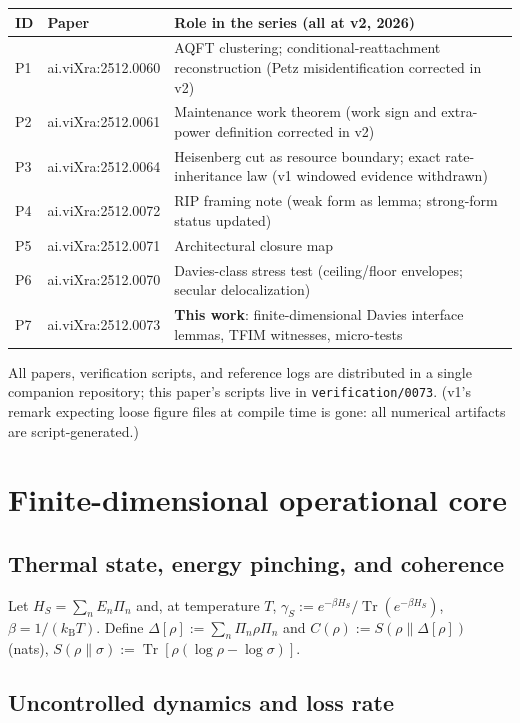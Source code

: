 \documentclass[11pt,a4paper]{article}
\theoremstyle{plain}
\theoremstyle{definition}
\theoremstyle{remark}
\newcommand{\Tr}{\operatorname{Tr}}
\newcommand{\kB}{k_{\mathrm{B}}}
\begin{document}
\begin{center}
\small
\begin{tabular}{lll}
\hline
ID & Paper & Role in the series (all at v2, 2026)\\
\hline
P1 & ai.viXra:2512.0060 & AQFT clustering; conditional-reattachment
reconstruction (Petz misidentification corrected in v2)\\
P2 & ai.viXra:2512.0061 & Maintenance work theorem (work sign and extra-power
definition corrected in v2)\\
P3 & ai.viXra:2512.0064 & Heisenberg cut as resource boundary; exact
rate-inheritance law (v1 windowed evidence withdrawn)\\
P4 & ai.viXra:2512.0072 & RIP framing note (weak form as lemma; strong-form
status updated)\\
P5 & ai.viXra:2512.0071 & Architectural closure map\\
P6 & ai.viXra:2512.0070 & Davies-class stress test (ceiling/floor envelopes;
secular delocalization)\\
P7 & ai.viXra:2512.0073 & \textbf{This work}: finite-dimensional Davies
interface lemmas, TFIM witnesses, micro-tests\\
\hline
\end{tabular}
\end{center}

All papers, verification scripts, and reference logs are distributed in a
single companion repository; this paper's scripts live in
\texttt{verification/0073}. (v1's remark expecting loose figure files at
compile time is gone: all numerical artifacts are script-generated.)

\section{Finite-dimensional operational core}

\subsection{Thermal state, energy pinching, and coherence}

Let $H_S = \sum_n E_n\Pi_n$ and, at temperature $T$,
$\gamma_S := e^{-\beta H_S}/\Tr(e^{-\beta H_S})$, $\beta = 1/(\kB T)$. Define
$\Delta[\rho] := \sum_n \Pi_n\rho\Pi_n$ and $C(\rho) := S(\rho\|\Delta[\rho])$
(nats), $S(\rho\|\sigma) := \Tr[\rho(\log\rho - \log\sigma)]$.

\subsection{Uncontrolled dynamics and loss rate}
\end{document}
